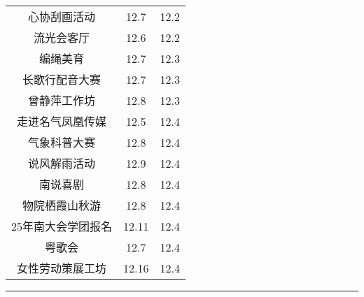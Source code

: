 \documentclass[letterpaper, 12pt]{article}
\begin{document}
\begin{multicols}{2}
{\begin{longtable}{|c|c|c|}
    心协刮画活动 & 12.7 & 12.2\\
    流光会客厅 & 12.6 & 12.2\\
    编绳美育 & 12.7 & 12.3\\
    长歌行配音大赛 & 12.7 & 12.3\\
    曾静萍工作坊 & 12.8 & 12.3\\
    走进名气凤凰传媒 & 12.5 & 12.4\\
    气象科普大赛 & 12.8 & 12.4\\
    说风解雨活动 & 12.9 & 12.4\\
    南说喜剧 & 12.8 & 12.4\\
    物院栖霞山秋游 & 12.8 & 12.4\\
    25年南大会学团报名 & 12.11 & 12.4\\
    粤歌会 & 12.7 & 12.4\\
    女性劳动策展工坊 & 12.16 & 12.4\\
    \hline
\end{longtable}
\unskip
\unpenalty
\unpenalty}\unvbox\colbbox
\end{multicols}
\hrule
\pagebreak
\end{document}
